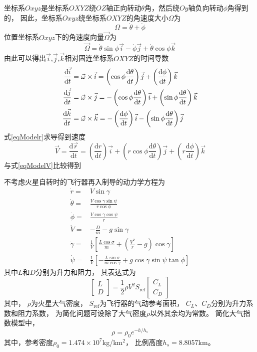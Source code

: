 坐标系$Oxyz$是坐标系$OXYZ$绕$OZ$轴正向转动$\theta$角，然后绕$Oy$轴负向转动$\phi$角得到的，
因此，坐标系$Oxyz$绕坐标系$OXYZ$的角速度大小$\Omega$为
\[\Omega = \dot{\theta} + \dot{\phi}\]
位置坐标系$Oxyz$下的角速度向量$\vec{\Omega}$为
\[\vec{\Omega} = \dot{\theta}\sin\phi\vec{i} - \dot{\phi}\vec{j} +\dot{\theta}\cos\phi\vec{k}\]
由此可以得出$\vec{i}$,$\vec{j}$,$\vec{k}$相对固连坐标系$OXYZ$的时间导数
\begin{align*}
    \frac{\text{\text{\text{\text{\text{d}}}}}\vec{i}}{\text{\text{\text{\text{\text{d}}}}}t} &=\vec{\omega} \times \vec{i}
    =  \left(\cos \phi \frac{\text{\text{\text{\text{\text{d}}}}}\theta}{\text{\text{\text{\text{\text{d}}}}}t}\right) \vec{j}
    + \left(\frac{\text{\text{\text{\text{\text{d}}}}}\phi}{\text{\text{\text{\text{\text{d}}}}}t}\right) \vec{k} \\
    \frac{\text{d}\vec{j}}{\text{d}t} &=\vec{\omega} \times \vec{j}
    = -\left(\cos \phi \frac{\text{d}\theta}{\text{d}t}\right) \vec{i}
    + \left(\sin \phi \frac{\text{d}\theta}{\text{d}t}\right) \vec{k} \\
    \frac{\text{d}\vec{k}}{\text{d}t} &=\vec{\omega} \times \vec{k}
    = -\left(\frac{\text{d}\phi}{\text{d}t}\right) \vec{i}
    - \left(\sin \phi \frac{\text{d}\theta}{\text{d}t}\right) \vec{j}
\end{align*}
式\eqref{eqModelr}求导得到速度
\[\vec{V}=\frac{\text{d} \vec{r}}{\text{d} t}=\left(\frac{\text{d} r}{\text{d} t}\right) \vec{i}+\left(r \cos \phi \frac{\text{d} \theta}{\text{d} t}\right) \vec{j}+\left(r \frac{\text{d} \phi}{\text{d} t}\right) \vec{k}\]
与式\eqref{eqModelV}比较得到

不考虑火星自转时的飞行器再入制导的动力学方程为
\begin{align}
    \dot{r} =& V\sin\gamma \\
    \dot{\theta} =& \frac{V \cos \gamma \sin \psi}{r \cos \phi} \\
    \dot{\phi} =& \frac{V \cos \gamma \cos \psi}{r} \\
    \dot{V} =& -\frac{D}{m} - g \sin \gamma \\
    \dot{\gamma} =& \frac{1}{V}\left[\frac{L\cos\sigma}{m}+\left(\frac{V^2}{r}-g\right)\cos\gamma\right] \\
    \dot{\psi} =& \frac{1}{V}\left[-\frac{L\sin\sigma}{m\cos\gamma}+g\cos\gamma\sin\psi\tan\phi\right]
\end{align} \label{eqModelTotal}
其中$L$和$D$分别为升力和阻力，
其表达式为
\begin{equation*}
    \left[\begin{matrix}
        L \\ D
    \end{matrix}\right]
    = \frac{1}{2}\rho V^2S_{\text{ref}}
    \left[\begin{matrix}
        C_L \\ C_D
    \end{matrix}\right]
\end{equation*}
其中，
$\rho$为火星大气密度，
$S_{\text{ref}}$为飞行器的气动参考面积，
$C_L$、$C_D$分别为升力系数和阻力系数，
为简化问题可设除了大气密度$\rho$以外其余均为常数。
简化大气指数模型中，
\[\rho=\rho_0e^{-h/h_s}\]
其中，参考密度$\rho_0=1.474\times10^7$kg/km$^2$，
比例高度$h_s=8.8057$km。
